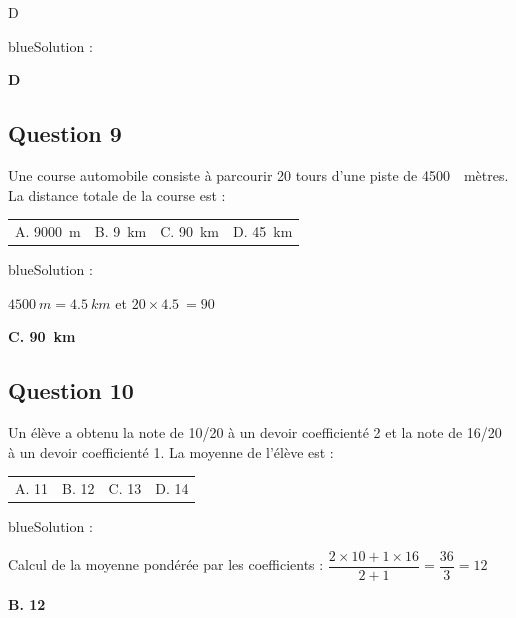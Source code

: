 \documentclass[10pt]{article}
\providecommand{\np}[2][]{{#2~#1}}
\begin{document}
D


\begin{color}{blue}Solution :\par
{}

\textbf{D}
\end{color}


\subsection*{Question 9}

Une course automobile consiste à parcourir 20 tours d'une piste de \np{4500}~mètres. La distance totale de la course est :
\begin{center}
\begin{tabularx}{.92\linewidth}{XXXX} A. \np[m]{9000} & B. \np[km]{9} & C. \np[km]{90} & D. \np[km]{45}
\end{tabularx}
\end{center}

\begin{color}{blue}Solution :\par
$\np[m]{4500} = \np[km]{4.5}$ et $20\times \np{4.5}=90$

\textbf{C. \np[km]{90}}
\end{color}


\subsection*{Question 10}

Un élève a obtenu la note de 10/20 à un devoir coefficienté 2 et la note de 16/20 à un devoir coefficienté 1. La moyenne de l'élève est :
\begin{center}
\begin{tabularx}{.92\linewidth}{XXXX} A. 11 & B. 12 & C. 13 & D. 14\end{tabularx}
\end{center}

\begin{color}{blue}Solution :\par
Calcul de la moyenne pondérée par les coefficients : $\dfrac{2\times 10 +  1\times 16}{2+1} = \dfrac{36}{3} = 12$

\textbf{B. 12}
\end{color}
\end{document}
